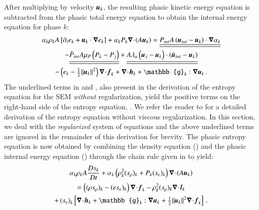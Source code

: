 \documentclass[preprint,10pt]{elsarticle}
\begin{document}
%
After multiplying  by velocity $\boldsymbol u_k$, the resulting phasic kinetic energy equation is subtracted from the phasic total energy equation to obtain the internal energy equation for phase $k$:
%
\begin{multline}\label{eq:int-ener-7-eqn-model-sect4}
\alpha_k \rho_k  A \left[ \partial_t  e_k + \mbold u_k \cdot \grad  e_k \right]  
+ \alpha_k P_k \div (A \mbold u_k ) =
  \underline{\underline{P_{int} A \left(\mbold u_{int}-\mbold u_k \right) \cdot \grad \alpha_k}}  \\
- \underline{\underline{\bar{P}_{int} A \mu_P \left(P_k-P_j \right)}} 
+ \underline{\underline{A \lambda_u \left(\mbold u_j-\mbold u_k  \right) \cdot \left(\bar{\mbold u}_{int}- \mbold u_k \right)}}\\
-\left( e_k -  \tfrac{1}{2} \| \mbold u_k \|^2 \right) \div \mbold f_k 
+ \div \mbold h_k + \mathbb{g}_k : \grad \mbold u_k \,.
\end{multline}
%
The underlined terms in  and , also present in the derivation of the entropy equation for the SEM \emph{without} regularization, yield the positive terms on the right-hand side of the entropy equation, . We refer the reader to  for a detailed derivation of the entropy equation  without viscous regularization. In this section, we deal with the \emph{regularized} system of equations and the above underlined terms are ignored in the remainder of this derivation for brevity. 
The phasic entropy equation is now obtained by combining the density equation () and the phasic internal energy equation () through the chain rule given in  to yield:
%
\begin{multline}\label{eq:ent-res-7-eqn-diss-terms}
\alpha_k \rho_k A \frac{Ds_k}{Dt} 
+ \alpha_k \left(  \rho^2_k  (s_\rho)_k + P_k (s_e)_k  \right) \div (A \mbold u_k )  \\
=  \left( (\rho s_\rho)_k - (e s_e)_k \right) \div \mbold f_k 
- \rho^2_k (s_\rho)_k \div \mbold l_k  \\
+ \left(s_e\right)_k \left[ \div \mbold h_k + \mathbb{g}_k : \grad \mbold u_k +  \tfrac{1}{2} \| \mbold u_k \|^2 \div \mbold f_k \right]
\,.
\end{multline}
\end{document}

